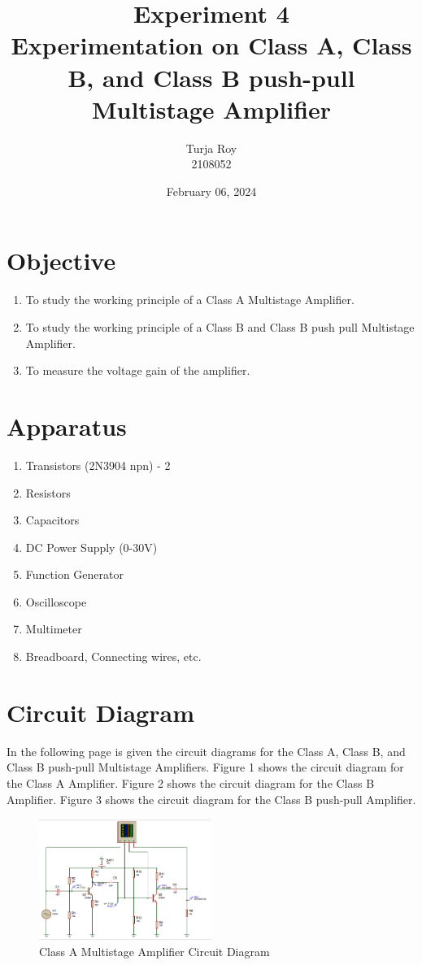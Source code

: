 \documentclass[12pt]{article}
\title{
    \textbf{\Large Experiment 4}\\
    \textbf{\Large Experimentation on Class A, Class B, and Class B push-pull Multistage Amplifier}
}
\author{
    Turja Roy\\
    2108052
}
\date{February 06, 2024}
\begin{document}
\maketitle

\section{Objective}
\begin{enumerate}
    \item To study the working principle of a Class A Multistage Amplifier.
    \item To study the working principle of a Class B and Class B push pull Multistage Amplifier.
    \item To measure the voltage gain of the amplifier.
\end{enumerate}

\section{Apparatus}
\begin{enumerate}
    \item Transistors (2N3904 npn) - 2
    \item Resistors
    \item Capacitors
    \item DC Power Supply (0-30V)
    \item Function Generator
    \item Oscilloscope
    \item Multimeter
    \item Breadboard, Connecting wires, etc.
\end{enumerate}

\section{Circuit Diagram}
In the following page is given the circuit diagrams for the Class A, Class B, and Class B push-pull Multistage Amplifiers. Figure 1 shows the circuit diagram for the Class A Amplifier. Figure 2 shows the circuit diagram for the Class B Amplifier. Figure 3 shows the circuit diagram for the Class B push-pull Amplifier.

\newpage
\begin{figure}[!htpb]
    \centering
    \includegraphics[width=0.5\textwidth]{Class_A_Diagram.png}
    \caption{Class A Multistage Amplifier Circuit Diagram}
\end{figure}
\end{document}
